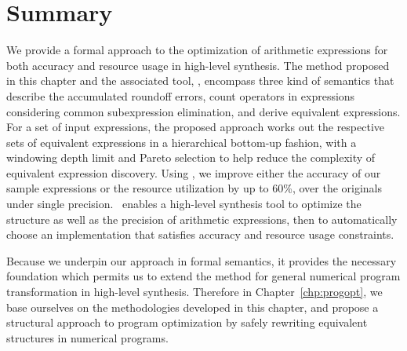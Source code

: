 \section{Summary}
\label{so:sec:conclusion}

We provide a formal approach to the optimization of arithmetic expressions
for both accuracy and resource usage in high-level synthesis.  The method
proposed in this chapter and the associated tool, \soap, encompass three kind
of semantics that describe the accumulated roundoff errors, count operators in
expressions considering common subexpression elimination, and derive equivalent
expressions.  For a set of input expressions, the proposed approach works out
the respective sets of equivalent expressions in a hierarchical bottom-up
fashion, with a windowing depth limit and Pareto selection to help reduce the
complexity of equivalent expression discovery.  Using \soap, we improve either
the accuracy of our sample expressions or the resource utilization by up to
60\%, over the originals under single precision. \soap~enables a high-level
synthesis tool to optimize the structure as well as the precision of arithmetic
expressions, then to automatically choose an implementation that satisfies
accuracy and resource usage constraints.

Because we underpin our approach in formal semantics, it provides the
necessary foundation which permits us to extend the method for general
numerical program transformation in high-level synthesis.  Therefore in
Chapter~\ref{chp:progopt}, we base ourselves on the methodologies developed
in this chapter, and propose a structural approach to program optimization by
safely rewriting equivalent structures in numerical programs.
